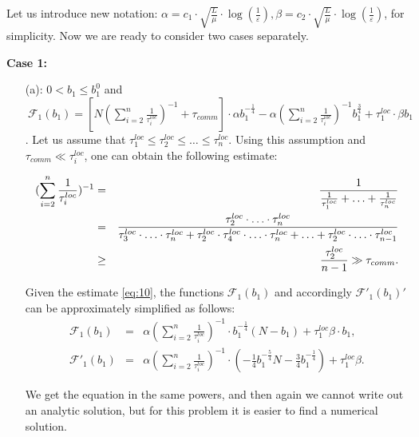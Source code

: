 \documentclass{article}
\theoremstyle{definition}
\theoremstyle{plain}
\begin{document}
Let us introduce new notation: $\alpha = c_1\cdot\sqrt{\frac{L}{\mu}}\cdot \log(\frac{1}{\varepsilon}),\beta = c_2\cdot\sqrt{\frac{L}{\mu}}\cdot \log(\frac{1}{\varepsilon}) $, for simplicity. Now we are ready to consider two cases separately. 

\textbf{Case 1:}

\begin{itemize}
    \item [(a):] $0 < b_1 \leq b_1^0$ and 
    $~\mathcal{F}_1(b_1) = [N (\sum\limits_{i = 2}^{n} \frac{1}{\tau_i^{loc}})^{-1} + \tau_{comm}]\cdot 
    \alpha  b_1^{-\frac{1}{4}} - 
    \alpha(\sum\limits_{i =
    2}^{n} \frac{1}{\tau_i^{loc}})^{-1} b_1^{\frac{3}{4}}  + \tau_1^{loc}\cdot\beta b_1$. Let us assume that
    $
    \tau_1^{loc} \leq \tau_2^{loc} \leq\ldots \leq \tau_n^{loc}.
    $
    Using this assumption and $\tau_{comm} \ll \tau_i^{loc}$, one can obtain the following estimate:

    \begin{eqnarray}
        \label{eq:10}
            (\sum\limits_{i = 2}^n \frac{1}{\tau_i^{loc}})^{-1} &=& \frac{1}{\frac{1}{\tau_1^{loc}} + \ldots + \frac{1}{\tau_n^{loc}}}
            \notag\\ &=& 
            \frac{\tau_2^{loc}\cdot \ldots \cdot\tau_n^{loc}}{\tau_3^{loc}\cdot \ldots \cdot\tau_n^{loc} + \tau_2^{loc}\cdot \tau_4^{loc}\cdot\ldots \cdot\tau_n^{loc} + \ldots + \tau_2^{loc}\cdot \ldots \cdot\tau_{n-1}^{loc}} 
            \notag\\ &\geq&\frac{\tau_2^{loc}}{n - 1} \gg \tau_{comm}.
    \end{eqnarray}
    
    Given the estimate \eqref{eq:10}, the functions $\mathcal{F}_1(b_1)$ and accordingly $\mathcal{F'}_1(b_1)'$ can be approximately simplified as follows:
    \begin{eqnarray*}
            \mathcal{F}_1(b_1) &=& \alpha(\sum\limits_{i = 2}^n \frac{1}{\tau_i^{loc}})^{-1}\cdot b_1^{-\frac{1}{4}}(N - b_1) + \tau_1^{loc}\beta\cdot b_1,
            \\
        \mathcal{F'}_1 (b_1) &=& \alpha(\sum\limits_{i = 2}^n \frac{1}{\tau_i^{loc}})^{-1}\cdot (-\frac{1}{4}b_1^{-\frac{5}{4}}N - \frac{3}{4}b_1^{-\frac{1}{4}}) + \tau_1^{loc}\beta.
    \end{eqnarray*}
    
    We get the equation in the same powers, and then again we cannot write out an analytic solution, but for this problem it is easier to find a numerical solution.


\end{itemize}
\end{document}
